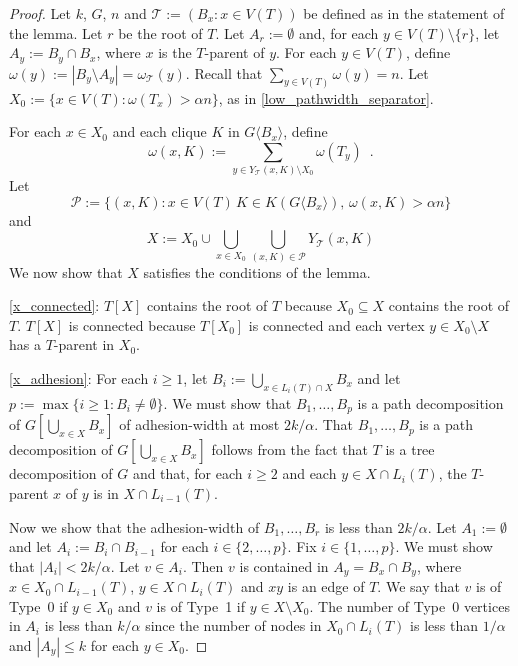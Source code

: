 \documentclass{patmorin}
\newcommand{\torso}[2]{{#1}\langle{#2}\rangle}
\renewcommand{\ge}{\geqslant}
\renewcommand{\le}{\leqslant}
\begin{document}
  \begin{proof}
    Let $k$, $G$, $n$ and $\mathcal{T}:=(B_x:x\in V(T))$ be defined as in the statement of the lemma.
    Let $r$ be the root of $T$. Let $A_r:=\emptyset$ and, for each $y\in V(T)\setminus\{r\}$, let $A_y:=B_y\cap B_x$, where $x$ is the $T$-parent of $y$.  For each $y\in V(T)$, define $\omega(y):=|B_y\setminus A_y|=\omega_\mathcal{T}(y)$. Recall that $\sum_{y\in V(T)}\omega(y)=n$.  Let $X_0:=\{x\in V(T):\omega(T_x)>\alpha n\}$, as in \cref{low_pathwidth_separator}.


    For each $x\in X_0$ and each clique $K$ in $\torso{G}{B_x}$, define
    \[
       \omega(x,K):=\sum_{y\in Y_{\mathcal{T}}(x,K)\setminus X_0}\omega(T_y)  \enspace .
    \]
    Let
    \[
       \mathcal{P} := \{(x,K):x\in V(T)\, K\in K(\torso{G}{B_x}),\, \omega(x,K)>\alpha n\}
    \]
    and
    \[
      X := X_0\cup\bigcup_{x\in X_0}\bigcup_{(x,K)\in\mathcal{P}} Y_\mathcal{T}(x,K)
    \]
    We now show that $X$ satisfies the conditions of the lemma.

    \noindent\ref{x_connected}: $T[X]$ contains the root of $T$ because $X_0\subseteq X$ contains the root of $T$. $T[X]$ is connected because $T[X_0]$ is connected and each vertex $y\in X_0\setminus X$ has a $T$-parent in $X_0$.

    \noindent\ref{x_adhesion}:  For each $i\ge 1$, let $B_i:=\bigcup_{x\in L_{i}(T)\cap X} B_x$ and let $p:=\max\{i\ge 1:B_i\neq\emptyset\}$.  We must show that $B_1,\ldots,B_p$ is a path decomposition of $G[\bigcup_{x\in X}B_x]$ of adhesion-width at most $2k/\alpha$. That $B_1,\ldots,B_p$ is a path decomposition of $G[\bigcup_{x\in X} B_x]$ follows from the fact that $T$ is a tree decomposition of $G$ and that, for each $i\ge 2$ and each $y\in X\cap L_i(T)$, the $T$-parent $x$ of $y$ is in $X\cap L_{i-1}(T)$.

    Now we show that the adhesion-width of $B_1,\ldots,B_r$ is less than $2k/\alpha$.  Let $A_1:=\emptyset$ and let $A_i:=B_{i}\cap B_{i-1}$ for each $i\in\{2,\ldots,p\}$. Fix $i\in\{1,\ldots,p\}$.  We must show that $|A_i|<2k/\alpha$.  Let $v\in A_i$. Then $v$ is contained in $A_y=B_x\cap B_y$, where $x\in X_0\cap L_{i-1}(T)$, $y\in X\cap L_i(T)$ and $xy$ is an edge of $T$. We say that $v$ is of Type~0 if $y\in X_{0}$ and $v$ is of Type~1 if $y\in X\setminus X_0$.  The number of Type~0 vertices in $A_i$ is less than $k/\alpha$ since the number of nodes in $X_{0}\cap L_i(T)$ is less than $1/\alpha$ and $|A_y|\le k$ for each $y\in X_{0}$.


\end{proof}
\end{document}
